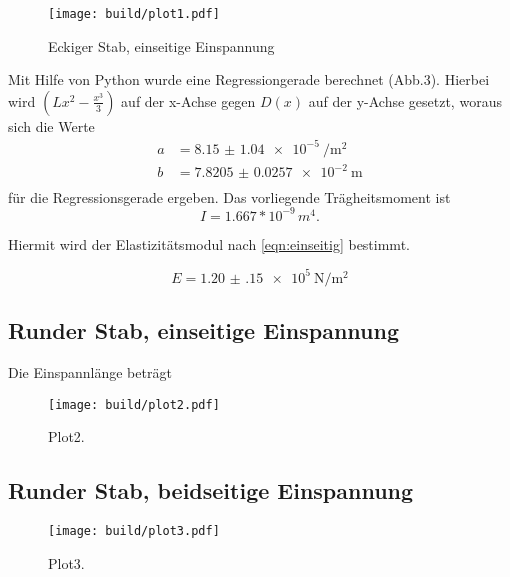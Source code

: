 \begin{figure}[h]
  \centering
  \texttt{[image: build/plot1.pdf]}
  \caption{Eckiger Stab, einseitige Einspannung}
  \label{fig:plot1}
\end{figure}



Mit Hilfe von Python wurde eine Regressiongerade berechnet (Abb.3).
Hierbei wird $(Lx^2- \frac{x^3}{3})$ auf der x-Achse gegen $D(x)$ auf der y-Achse
gesetzt, woraus sich die Werte
\begin{align*}
  a &= \SI{8.15(104)e-5}{\per\square\meter} \\
  b &= \SI{7.8205(257)e-2}{\meter} \\
\end{align*}
für die Regressionsgerade ergeben.
\newline
Das vorliegende Trägheitsmoment ist
\begin{equation*}
  I = 1.667* 10^{-9}\, m^4.
\end{equation*}

Hiermit wird der Elastizitätsmodul nach \ref{eqn:einseitig} bestimmt.

\begin{equation*}
  E = \SI{1.20(15)e+5}{\newton\per\square\meter}
\end{equation*}






\subsection{Runder Stab, einseitige Einspannung}
Die Einspannlänge beträgt 
\begin{figure}[h]
  \centering
  \texttt{[image: build/plot2.pdf]}
  \caption{Plot2.}
  \label{fig:plot2}
\end{figure}

\subsection{Runder Stab, beidseitige Einspannung}
\begin{figure}
  \centering
  \texttt{[image: build/plot3.pdf]}
  \caption{Plot3.}
  \label{fig:plot3}
\end{figure}
